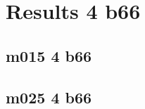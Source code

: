 \documentclass[pdftex,letterpaper,10pt]{article}
\begin{document}
\clearpage \section{Results 4 b66}

\subsection{m015 4 b66}



\clearpage \subsection{m025 4 b66}




\clearpage
\end{document}
